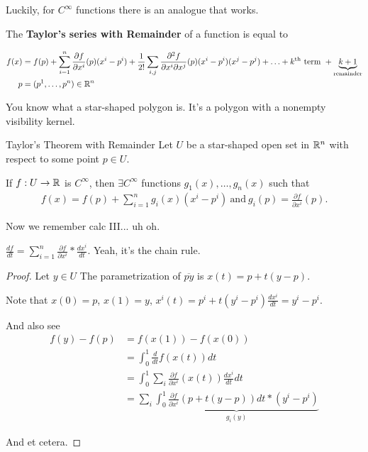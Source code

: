 \documentclass[12pt, twosided]{article}
\begin{document}
Luckily, for \(C^\infty\) functions there is an analogue that works.

The \textbf{Taylor's series with Remainder} of a function is equal to

\begin{align*}
  f(x) &= f(p) + \sum_{i = 1}^n \frac{\partial f}{\partial x^i}(p) (x^i - p^i) + \frac{1}{2!} \sum_{i, j} \frac{\partial^2 f}{\partial x^i \partial x^j}(p) (x^i - p^i)(x^j - p^j) + \ldots + k^\text{th} \text{ term } + \underbrace{k+1}_{\text{remainder}} \\
  p &= (p^1, \ldots, p^n) \in \mathbb{R}^n
\end{align*}

You know what a star-shaped polygon is. It's a polygon with a nonempty visibility kernel.

\begin{thm}{Taylor's Theorem with Remainder}
  Let \(U\) be a star-shaped open set in \(\mathbb{R}^n\) with respect to some point \(p \in U\).

  If \(f: U \to \mathbb{R} \) is \(C^\infty\), then \(\exists C^\infty\) functions \(g_1(x), \ldots, g_n(x)\) such that
  \begin{align*}
    f(x) = f(p) + \sum_{i = 1}^n g_i(x)(x^i - p^i) \ \text{and}\ g_i(p) = \frac{\partial f}{\partial x^i}(p).
  \end{align*}
\end{thm}

Now we remember calc III... uh oh.

\begin{center}
\end{center}
\(\frac{d f}{dt} = \sum_{i = 1}^n \frac{\partial f}{\partial x^i} * \frac{d x^i}{d t}\).
Yeah, it's the chain rule.

\begin{proof}
  Let \(y \in U\) The parametrization of \(\overline{py}\) is \(x(t) = p + t(y - p)\).

  Note that \(x(0) = p\), \(x(1) = y\), \(x^i(t) = p^i + t(y^i - p^i) \frac{d x^i}{d t} = y^i - p ^i\).

  And also see
  \begin{align*}
    f(y) - f(p) &= f(x(1)) - f(x(0)) \\
                &= \int_0^1 \frac{d}{dt}f(x(t)) dt \\
                &= \int_0^1 \sum_i \frac{\partial f}{\partial x^i}(x(t)) \frac{dx^i}{dt} dt \\
                &= \sum_i \underbrace{\int_0^1 \frac{\partial f}{\partial x^i} (p + t(y - p)) dt * (y^i - p^i)}_{g_i(y)}
  \end{align*}

  And et cetera.
\end{proof}
\end{document}
